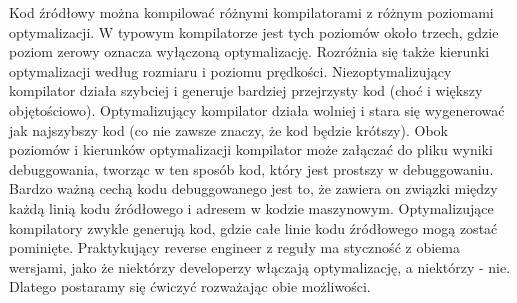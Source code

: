 Kod źródłowy można kompilować różnymi kompilatorami z różnym poziomami optymalizacji. W typowym kompilatorze jest tych poziomów około trzech, gdzie poziom zerowy oznacza wyłączoną optymalizację. Rozróżnia się także kierunki optymalizacji według rozmiaru i poziomu prędkości. Niezoptymalizujący kompilator działa szybciej i generuje bardziej przejrzysty kod (choć i większy objętościowo). Optymalizujący kompilator działa wolniej i stara się wygenerować jak najszybszy kod (co nie zawsze znaczy, że kod będzie krótszy). Obok poziomów i kierunków optymalizacji kompilator może załączać do pliku wyniki debuggowania, tworząc w ten sposób kod, który jest prostszy w debuggowaniu. Bardzo ważną cechą kodu debuggowanego jest to, że zawiera on związki między każdą linią kodu źródłowego i adresem w kodzie maszynowym. Optymalizujące kompilatory zwykle generują kod, gdzie całe linie kodu źródłowego mogą zostać pominięte. Praktykujący reverse engineer z reguły ma styczność z obiema wersjami, jako że niektórzy developerzy włączają optymalizację, a niektórzy - nie. Dlatego postaramy się ćwiczyć rozważając obie możliwości.

